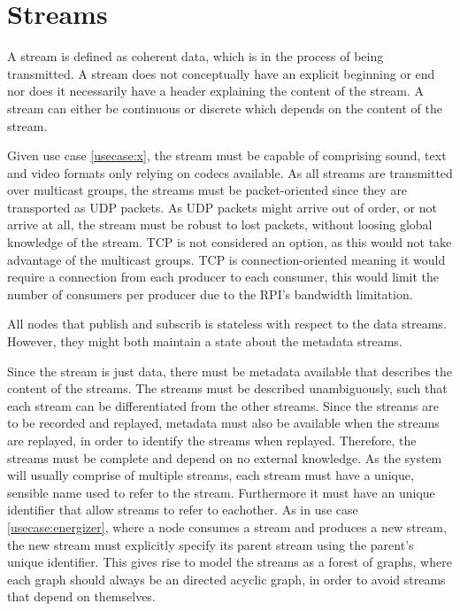 \section{Streams}
A stream is defined as coherent data, which is in the process of being transmitted. A stream does not conceptually have an explicit beginning or end nor does it necessarily have a header explaining the content of the stream. A stream can either be continuous or discrete which depends on the content of the stream. 


Given use case \ref{usecase:x}, the stream must be capable of comprising sound, text and video formats only relying on codecs available. As all streams are transmitted over multicast groups, the streams must be packet-oriented since they are transported as UDP packets.
As UDP packets might arrive out of order, or not arrive at all, the stream must be robust to lost packets, without loosing global knowledge of the stream.
TCP is not considered an option, as this would not take advantage of the multicast groups. TCP is connection-oriented meaning it would require a connection from each producer to each consumer, this would limit the number of consumers per producer due to the RPI's bandwidth limitation.

All nodes that publish and subscrib is stateless with respect to the data streams. However, they might both maintain a state about the metadata streams.

Since the stream is just data, there must be metadata available that describes the content of the streams. The streams must be described unambiguously, such that each stream can be differentiated from the other streams. Since the streams are to be recorded and replayed, metadata must also be available when the streams are replayed, in order to identify the streams when replayed. Therefore, the streams must be complete and depend on no external knowledge.
As the system will usually comprise of multiple streams, each stream must have a unique, sensible name used to refer to the stream. Furthermore it must have an unique identifier that allow streams to refer to eachother.
As in use case \ref{usecase:energizer}, where a node consumes a stream and produces a new stream, the new stream must explicitly specify its parent stream using the parent's unique identifier. This gives rise to model the streams as a forest of graphs, where each graph should always be an directed acyclic graph, in order to avoid streams that depend on themselves.

